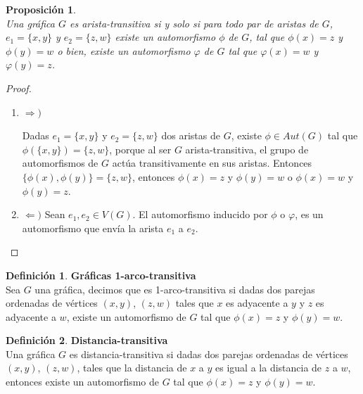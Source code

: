 \documentclass[12pt]{book}
\newtheorem{proposition}{Proposición}
\theoremstyle{definition}
\newtheorem{definition}{Definición}
\begin{document}
\begin{proposition}\textbf{}\\
  Una gráfica $G$ es arista-transitiva si y solo si para todo par de
  aristas de $G$, $e_1=\{x,y\}$ y $e_2=\{z,w\}$ existe un automorfismo
  $\phi$ de $G$, tal que $\phi(x)=z$ y $\phi(y)=w$ o bien, existe un
  automorfismo $\varphi$ de $G$ tal que $\varphi(x)=w$ y
  $\varphi(y)=z$.
\end{proposition}

\begin{proof}

\begin{enumerate}

\item $\Rightarrow)$

Dadas $e_1=\{x,y\}$ y $e_2=\{z,w\}$ dos aristas de $G$,
existe $\phi\in Aut(G)$ tal que $\phi(\{x,y\})=\{z,w\}$, porque al ser
$G$ arista-transitiva, el grupo de automorfismos de $G$ actúa
transitivamente en sus aristas. Entonces
$\{\phi(x),\phi(y)\}=\{z,w\}$, entonces $\phi(x)=z$ y $\phi(y)=w$ o
$\phi(x)=w$ y $\phi(y)=z$.

\item
$\Leftarrow)$
Sean $e_1,e_2\in V(G)$. El automorfismo inducido por $\phi$ o $\varphi$, es un
automorfismo que envía la arista $e_1$ a $e_2$.
\end{enumerate}
\end{proof}



\begin{definition}\textbf{Gráficas 1-arco-transitiva}\\
  Sea $G$ una gráfica, decimos que es 1-arco-transitiva si dadas dos
  parejas ordenadas de vértices $(x,y)$, $(z,w)$ tales que $x$
  es adyacente a $y$ y
  $z$ es adyacente a $w$, existe un automorfismo de $G$ tal que $\phi(x)=z$ y
  $\phi(y)=w$.
\end{definition}



\begin{definition}\textbf{Distancia-transitiva}\\
  Una gráfica $G$ es distancia-transitiva si dadas dos
  parejas ordenadas de vértices $(x,y)$, $(z,w)$, tales que la distancia de $x$
  a $y$ es igual a la distancia de $z$ a $w$,
  entonces existe un automorfismo de $G$ tal que $\phi(x)=z$ y
  $\phi(y)=w$.
\end{definition}
\end{document}

